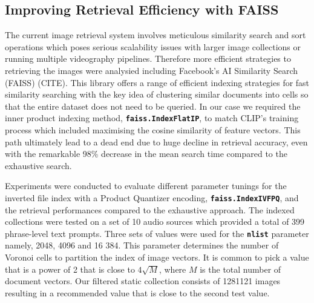\documentclass{l4proj}
\begin{document}
\subsection{Improving Retrieval Efficiency with FAISS}
The current image retrieval system involves meticulous similarity search and sort operations which poses serious scalability issues with larger image collections or running multiple videography pipelines. Therefore more efficient strategies to retrieving the images were analysied including Facebook's AI Similarity Search (FAISS) (CITE). This library offers a range of efficient indexing strategies for fast similarity searching with the key idea of clustering similar documents into cells so that the entire dataset does not need to be queried. In our case we required the inner product indexing method, \textbf{\lstinline|faiss.IndexFlatIP|}, to match CLIP's training process which included maximising the cosine similarity of feature vectors. This path ultimately lead to a dead end due to huge decline in retrieval accuracy, even with the remarkable 98\% decrease in the mean search time compared to the exhaustive search. 

Experiments were conducted to evaluate different parameter tunings for the inverted file index with a Product Quantizer encoding, \textbf{\lstinline|faiss.IndexIVFPQ|}, and the retrieval performances compared to the exhaustive approach. The indexed collections were tested on a set of 10 audio sources which provided a total of 399 phrase-level text prompts. Three sets of values were used for the \textbf{\lstinline|nlist|} parameter namely, 2048, 4096 and 16 384. This parameter determines the number of Voronoi cells to partition the index of image vectors. It is common to pick a value that is a power of 2 that is close to $4\sqrt{M}$, where $M$ is the total number of document vectors. Our filtered static collection consists of 1281121 images resulting in a recommended value that is close to the second test value. 
\end{document}
